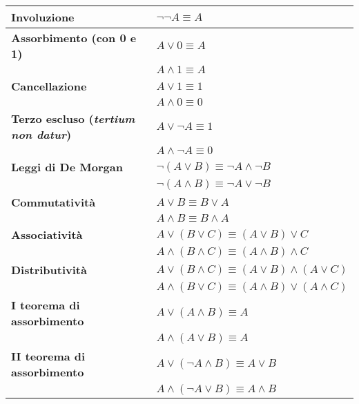 \documentclass[a4paper,11pt]{report}
\begin{document}
        \begin{table}[H]
            \centering
            \renewcommand{\arraystretch}{1.3}
            \begin{tabular}{|l|l|}
                \hline
                \textbf{Involuzione} & $\neg\neg A \equiv A$ \\
                \hline
                \textbf{Assorbimento (con 0 e 1)} &
                $A \lor 0 \equiv A$ \\
                                                  & $A \land 1 \equiv A$ \\
                                                  \hline
                \textbf{Cancellazione} &
                $A \lor 1 \equiv 1$ \\
                                       & $A \land 0 \equiv 0$ \\
                                       \hline
                \textbf{Terzo escluso (\textit{tertium non datur})} &
                $A \lor \neg A \equiv 1$ \\
                                                                    & $A \land \neg A \equiv 0$ \\
                                                                    \hline
                \textbf{Leggi di De Morgan} &
                $\neg(A \lor B) \equiv \neg A \land \neg B$ \\
                                            & $\neg(A \land B) \equiv \neg A \lor \neg B$ \\
                                            \hline
                \textbf{Commutatività} &
                $A \lor B \equiv B \lor A$ \\
                                       & $A \land B \equiv B \land A$ \\
                                       \hline
                \textbf{Associatività} &
                $A \lor (B \lor C) \equiv (A \lor B) \lor C$ \\
                                       & $A \land (B \land C) \equiv (A \land B) \land C$ \\
                                       \hline
                \textbf{Distributività} &
                $A \lor (B \land C) \equiv (A \lor B) \land (A \lor C)$ \\
                                        & $A \land (B \lor C) \equiv (A \land B) \lor (A \land C)$ \\
                                        \hline
                \textbf{I teorema di assorbimento} &
                $A \lor (A \land B) \equiv A$ \\
                                                   & $A \land (A \lor B) \equiv A$ \\
                                                   \hline
                \textbf{II teorema di assorbimento} &
                $A \lor (\neg A \land B) \equiv A \lor B$ \\
                                                    & $A \land (\neg A \lor B) \equiv A \land B$ \\
                                                    \hline


\end{tabular}
\end{table}
\end{document}
